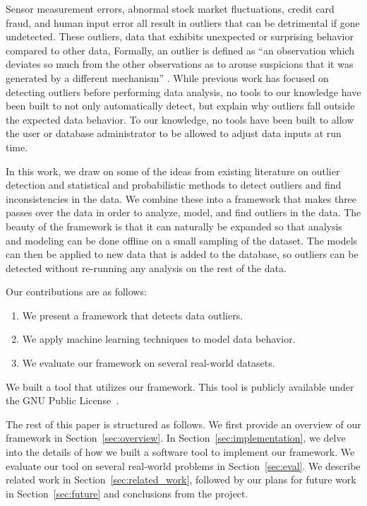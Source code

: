 
Sensor measurement errors, abnormal stock market fluctuations, credit card fraud, and human input error all result in outliers that can be detrimental if gone undetected.
These outliers, data that exhibits unexpected or surprising behavior compared to other data, 
Formally, an outlier is defined as “an observation which deviates so much from the other observations as to arouse suspicions that it was generated by a different mechanism” \cite{Hawkins1980}.
While previous work has focused on detecting outliers before performing data analysis, no tools to our knowledge have been built to not only automatically detect, but explain why outliers fall outside the expected data behavior.
To our knowledge, no tools have been built to allow the user or database administrator to be allowed to adjust data inputs at run time.


In this work, we draw on some of the ideas from existing literature on outlier detection and statistical and probabilistic methods to detect outliers and find inconsistencies in the data.
We combine these into a framework that makes three passes over the data in order to analyze, model, and find outliers in the data.
The beauty of the framework is that it can naturally be expanded so that analysis and modeling can be done offline on a small sampling of the dataset.
The models can then be applied to new data that is added to the database, so outliers can be detected without re-running any analysis on the rest of the data.

Our contributions are as follows:
\begin{enumerate}
\item We present a framework that detects data outliers.
\item We apply machine learning techniques to model data behavior.
\item We evaluate our framework on several real-world datasets.
\end{enumerate}

We built a tool that utilizes our framework.
This tool is publicly available under the GNU Public License~\cite{github}.

The rest of this paper is structured as follows.
We first provide an overview of our framework in Section~\ref{sec:overview}.
In Section~\ref{sec:implementation}, we delve into the details of how we built a software tool to implement our framework.
We evaluate our tool on several real-world problems in Section~\ref{sec:eval}.
We describe related work in Section~\ref{sec:related_work}, followed by our plans for future work in Section~\ref{sec:future} and conclusions from the project.
